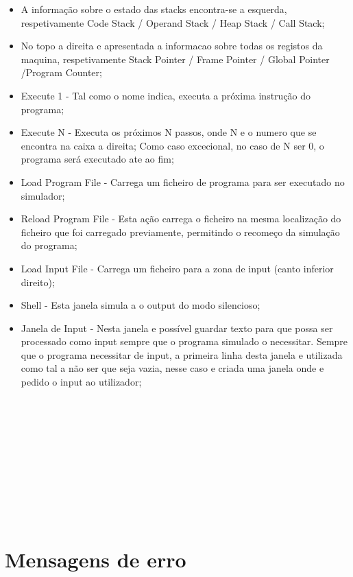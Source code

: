\documentclass{report}
\begin{document}
	\begin{itemize}
		\item A informação sobre o estado das stacks encontra-se a esquerda, respetivamente
		 Code Stack / Operand Stack / Heap Stack /	Call Stack;
		\item No topo a direita e apresentada a informacao sobre todas os registos da maquina, respetivamente
			Stack Pointer / Frame Pointer /	Global Pointer /Program Counter;
		\item Execute 1 - Tal como o nome indica, executa a próxima instrução do programa;
		\item Execute N - Executa os próximos N passos, onde N e o numero que se encontra na caixa a direita; Como caso excecional,
		no caso de N ser 0, o programa será executado ate ao fim;
		\item Load Program File - Carrega um ficheiro de programa para ser executado no simulador;
		\item Reload Program File - Esta ação carrega o ficheiro na	mesma localização do ficheiro que foi carregado previamente,
		permitindo o recomeço da simulação do programa;
		\item Load Input File - Carrega um ficheiro para a zona de input (canto inferior direito);
		\item Shell - Esta janela simula a o output do modo silencioso;
		\item Janela de Input - Nesta janela e possível guardar texto para que possa ser processado como input sempre que
		o programa simulado o necessitar. Sempre que o programa necessitar de input, a primeira linha desta janela e utilizada como tal
		a não ser que seja vazia, nesse caso e criada uma janela onde e pedido o input ao utilizador;
	\end{itemize}

\null\\
\null\\
\null\\
\null\\
\null\\
\null\\
\null\\
\null\\
\null\\
\section{Mensagens de erro}
\end{document}
